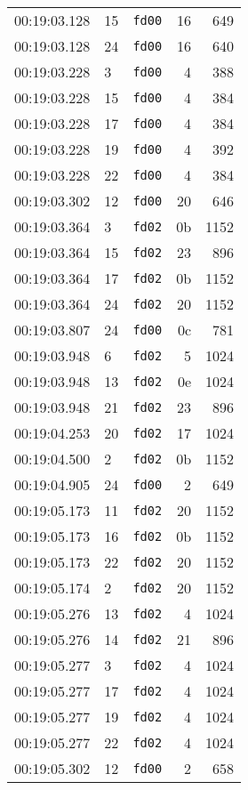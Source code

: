 \documentclass{article}
\begin{document}
\begin{longtable}{lllrr}
00:19:03.128 & 15 & \texttt{fd00} & 16 & 649 \\
00:19:03.128 & 24 & \texttt{fd00} & 16 & 640 \\
00:19:03.228 & 3 & \texttt{fd00} & 4 & 388 \\
00:19:03.228 & 15 & \texttt{fd00} & 4 & 384 \\
00:19:03.228 & 17 & \texttt{fd00} & 4 & 384 \\
00:19:03.228 & 19 & \texttt{fd00} & 4 & 392 \\
00:19:03.228 & 22 & \texttt{fd00} & 4 & 384 \\
00:19:03.302 & 12 & \texttt{fd00} & 20 & 646 \\
00:19:03.364 & 3 & \texttt{fd02} & 0b & 1152 \\
00:19:03.364 & 15 & \texttt{fd02} & 23 & 896 \\
00:19:03.364 & 17 & \texttt{fd02} & 0b & 1152 \\
00:19:03.364 & 24 & \texttt{fd02} & 20 & 1152 \\
00:19:03.807 & 24 & \texttt{fd00} & 0c & 781 \\
00:19:03.948 & 6 & \texttt{fd02} & 5 & 1024 \\
00:19:03.948 & 13 & \texttt{fd02} & 0e & 1024 \\
00:19:03.948 & 21 & \texttt{fd02} & 23 & 896 \\
00:19:04.253 & 20 & \texttt{fd02} & 17 & 1024 \\
00:19:04.500 & 2 & \texttt{fd02} & 0b & 1152 \\
00:19:04.905 & 24 & \texttt{fd00} & 2 & 649 \\
00:19:05.173 & 11 & \texttt{fd02} & 20 & 1152 \\
00:19:05.173 & 16 & \texttt{fd02} & 0b & 1152 \\
00:19:05.173 & 22 & \texttt{fd02} & 20 & 1152 \\
00:19:05.174 & 2 & \texttt{fd02} & 20 & 1152 \\
00:19:05.276 & 13 & \texttt{fd02} & 4 & 1024 \\
00:19:05.276 & 14 & \texttt{fd02} & 21 & 896 \\
00:19:05.277 & 3 & \texttt{fd02} & 4 & 1024 \\
00:19:05.277 & 17 & \texttt{fd02} & 4 & 1024 \\
00:19:05.277 & 19 & \texttt{fd02} & 4 & 1024 \\
00:19:05.277 & 22 & \texttt{fd02} & 4 & 1024 \\
00:19:05.302 & 12 & \texttt{fd00} & 2 & 658 \\

\end{longtable}
\end{document}
